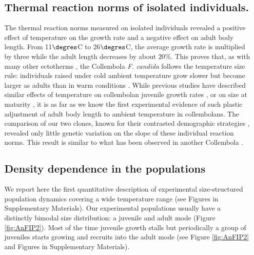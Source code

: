 \subsection{Thermal reaction norms of isolated individuals.}

The thermal reaction norms measured on isolated individuals revealed a positive
effect of temperature on the growth rate and a negative effect on adult body
length. From 11$\degres$C to 26$\degres$C, the average growth rate is multiplied
by three while the adult length decreases by about $20\%$. This proves that, as
with many other ectotherms \autocites{atkinson1994a,angilletta2009a}, the
Collembola \textit{F. candida} follows the temperature size rule: individuals
raised under cold ambient temperature grow slower but become larger as adults
than in warm conditions \autocites{angilletta2003a}. While previous studies have
described similar effects of temperature on collembolan juvenile growth rates
\autocites{birkemoe2000a,driessen2007a,ellers2008a,ellers2011b}, or on size at
maturity \autocites{stam1996a}, it is as far as we know the first experimental
evidence of such plastic adjustment of adult body length to ambient temperature
in collembolans. The comparison of our two clones, known for their contrasted
demographic strategies \autocites{tully2008a,tully2011a}, revealed only little
genetic variation on the slope of these individual reaction norms. This result
is similar to what has been observed in another Collembola \autocites{driessen2007a}.

\subsection{Density dependence in the populations}

We report here the first quantitative description of experimental
size-structured population dynamics covering a wide temperature range (see
Figures in Supplementary Materials).
Our experimental populations usually have a distinctly bimodal size
distribution: a juvenile and adult mode (Figure \ref{fig:AnFIP2}). Most of the time
juvenile growth stalls but periodically a group of juveniles starts growing and recruits
into the adult mode (see Figure \ref{fig:AnFIP2} and
Figures in Supplementary Materials).

